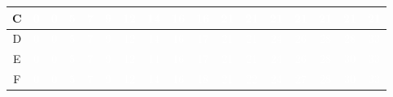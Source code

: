\documentclass{article}
\begin{document}
\begin{center}
\begin{tabular}{|c|c|c|c|c|c|c|c|c|c|c|c|c|c|c|c|c|}
C & \cellcolor{rojo}\textcolor{white}{0} & \cellcolor{rojo}\textcolor{white}{0} & \cellcolor{verde}\textcolor{white}{5} & \cellcolor{rojo}\textcolor{white}{7} & \cellcolor{rojo}\textcolor{white}{9} & \cellcolor{verde}\textcolor{white}{12} & \cellcolor{verde}\textcolor{white}{14} & \cellcolor{rojo}\textcolor{white}{16} & \cellcolor{rojo}\textcolor{white}{16} & \cellcolor{verde}\textcolor{white}{21} & \cellcolor{verde}\textcolor{white}{21} & \cellcolor{verde}\textcolor{white}{21} & \cellcolor{verde}\textcolor{white}{21} & \cellcolor{verde}\textcolor{white}{21} & \cellcolor{verde}\textcolor{white}{21} & \cellcolor{verde}\textcolor{white}{21} \\ \hline
D & \cellcolor{rojo}\textcolor{white}{0} & \cellcolor{rojo}\textcolor{white}{0} & \cellcolor{rojo}\textcolor{white}{5} & \cellcolor{rojo}\textcolor{white}{7} & \cellcolor{rojo}\textcolor{white}{9} & \cellcolor{rojo}\textcolor{white}{12} & \cellcolor{rojo}\textcolor{white}{14} & \cellcolor{rojo}\textcolor{white}{16} & \cellcolor{verde}\textcolor{white}{17} & \cellcolor{rojo}\textcolor{white}{21} & \cellcolor{rojo}\textcolor{white}{21} & \cellcolor{verde}\textcolor{white}{24} & \cellcolor{verde}\textcolor{white}{26} & \cellcolor{verde}\textcolor{white}{28} & \cellcolor{verde}\textcolor{white}{28} & \cellcolor{verde}\textcolor{white}{33} \\ \hline
E & \cellcolor{rojo}\textcolor{white}{0} & \cellcolor{rojo}\textcolor{white}{0} & \cellcolor{rojo}\textcolor{white}{5} & \cellcolor{rojo}\textcolor{white}{7} & \cellcolor{rojo}\textcolor{white}{9} & \cellcolor{rojo}\textcolor{white}{12} & \cellcolor{rojo}\textcolor{white}{14} & \cellcolor{rojo}\textcolor{white}{16} & \cellcolor{rojo}\textcolor{white}{17} & \cellcolor{rojo}\textcolor{white}{21} & \cellcolor{rojo}\textcolor{white}{21} & \cellcolor{rojo}\textcolor{white}{24} & \cellcolor{rojo}\textcolor{white}{26} & \cellcolor{rojo}\textcolor{white}{28} & \cellcolor{verde}\textcolor{white}{30} & \cellcolor{rojo}\textcolor{white}{33} \\ \hline
F & \cellcolor{rojo}\textcolor{white}{0} & \cellcolor{rojo}\textcolor{white}{0} & \cellcolor{rojo}\textcolor{white}{5} & \cellcolor{rojo}\textcolor{white}{7} & \cellcolor{rojo}\textcolor{white}{9} & \cellcolor{rojo}\textcolor{white}{12} & \cellcolor{rojo}\textcolor{white}{14} & \cellcolor{rojo}\textcolor{white}{16} & \cellcolor{verde}\textcolor{white}{18} & \cellcolor{rojo}\textcolor{white}{21} & \cellcolor{verde}\textcolor{white}{22} & \cellcolor{rojo}\textcolor{white}{24} & \cellcolor{verde}\textcolor{white}{27} & \cellcolor{rojo}\textcolor{white}{28} & \cellcolor{rojo}\textcolor{white}{30} & \cellcolor{rojo}\textcolor{white}{33} \\ \hline

\end{tabular}
\end{center}
\end{document}
